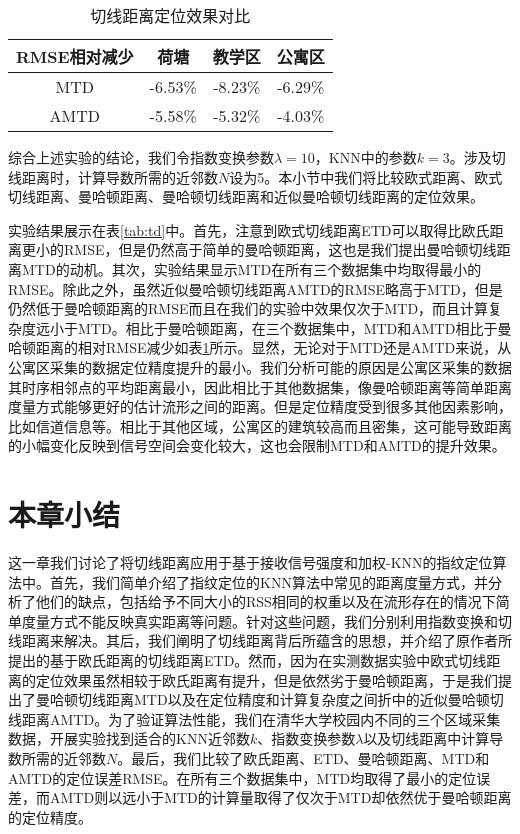 \begin{table}[tbp]
	\caption{切线距离定位效果对比}
	\begin{center}
		\begin{tabular}{cccc}
			\toprule
			RMSE相对减少 &  荷塘 & 教学区 & 公寓区 \\
			\midrule
			MTD & -6.53\% & -8.23\% & -6.29\% \\
			\midrule
			AMTD & -5.58\% & -5.32\% & -4.03\% \\
			\bottomrule
		\end{tabular}
		\label{tab:td_relative}
	\end{center}
\end{table}

综合上述实验的结论，我们令指数变换参数$\lambda=10$，KNN中的参数$k=3$。涉及切线距离时，计算导数所需的近邻数$N$设为5。本小节中我们将比较欧式距离、欧式切线距离、曼哈顿距离、曼哈顿切线距离和近似曼哈顿切线距离的定位效果。

实验结果展示在表\ref{tab:td}中。首先，注意到欧式切线距离ETD可以取得比欧氏距离更小的RMSE，但是仍然高于简单的曼哈顿距离，这也是我们提出曼哈顿切线距离MTD的动机。其次，实验结果显示MTD在所有三个数据集中均取得最小的RMSE。除此之外，虽然近似曼哈顿切线距离AMTD的RMSE略高于MTD，但是仍然低于曼哈顿距离的RMSE而且在我们的实验中效果仅次于MTD，而且计算复杂度远小于MTD。相比于曼哈顿距离，在三个数据集中，MTD和AMTD相比于曼哈顿距离的相对RMSE减少如表\ref{tab:td_relative}所示。显然，无论对于MTD还是AMTD来说，从公寓区采集的数据定位精度提升的最小。我们分析可能的原因是公寓区采集的数据其时序相邻点的平均距离最小，因此相比于其他数据集，像曼哈顿距离等简单距离度量方式能够更好的估计流形之间的距离。但是定位精度受到很多其他因素影响，比如信道信息等。相比于其他区域，公寓区的建筑较高而且密集，这可能导致距离的小幅变化反映到信号空间会变化较大，这也会限制MTD和AMTD的提升效果。

\section{本章小结}

这一章我们讨论了将切线距离应用于基于接收信号强度和加权-KNN的指纹定位算法中。首先，我们简单介绍了指纹定位的KNN算法中常见的距离度量方式，并分析了他们的缺点，包括给予不同大小的RSS相同的权重以及在流形存在的情况下简单度量方式不能反映真实距离等问题。针对这些问题，我们分别利用指数变换和切线距离来解决。其后，我们阐明了切线距离背后所蕴含的思想，并介绍了原作者所提出的基于欧氏距离的切线距离ETD。然而，因为在实测数据实验中欧式切线距离的定位效果虽然相较于欧氏距离有提升，但是依然劣于曼哈顿距离，于是我们提出了曼哈顿切线距离MTD以及在定位精度和计算复杂度之间折中的近似曼哈顿切线距离AMTD。为了验证算法性能，我们在清华大学校园内不同的三个区域采集数据，开展实验找到适合的KNN近邻数$k$、指数变换参数$\lambda$以及切线距离中计算导数所需的近邻数$N$。最后，我们比较了欧氏距离、ETD、曼哈顿距离、MTD和AMTD的定位误差RMSE。在所有三个数据集中，MTD均取得了最小的定位误差，而AMTD则以远小于MTD的计算量取得了仅次于MTD却依然优于曼哈顿距离的定位精度。





